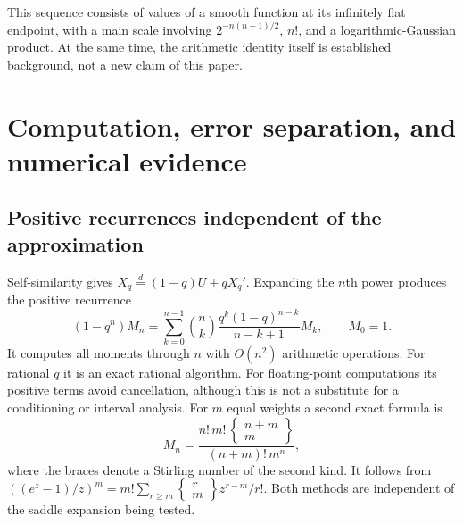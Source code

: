 \documentclass[11pt,a4paper]{article}
\numberwithin{equation}{section}
\theoremstyle{definition}\newtheorem{definition}[theorem]{Definition}
\theoremstyle{remark}\newtheorem{remark}[theorem]{Remark}
\begin{document}
This sequence consists of values of a smooth function at its infinitely flat endpoint, with a main scale involving $2^{-n(n-1)/2}$, $n!$, and a logarithmic-Gaussian product. At the same time, the arithmetic identity itself is established background, not a new claim of this paper.

\section{Computation, error separation, and numerical evidence}
\label{sec:computation}
\subsection{Positive recurrences independent of the approximation}
Self-similarity gives $X_q\overset d=(1-q)U+qX_q'$. Expanding the $n$th power produces the positive recurrence
\begin{equation}\label{eq:recurrence}
 (1-q^n)M_n=
 \sum_{k=0}^{n-1}\binom nk\frac{q^k(1-q)^{n-k}}{n-k+1}M_k,
 \qquad M_0=1.
\end{equation}
It computes all moments through $n$ with $O(n^2)$ arithmetic operations. For rational $q$ it is an exact rational algorithm. For floating-point computations its positive terms avoid cancellation, although this is not a substitute for a conditioning or interval analysis.
For $m$ equal weights a second exact formula is
\begin{equation}\label{eq:equalweights}
 M_n=\frac{n!\,m!\,\left\{\begin{smallmatrix}n+m\\m\end{smallmatrix}\right\}}
              {(n+m)!\,m^n},
\end{equation}
where the braces denote a Stirling number of the second kind. It follows from
$((e^z-1)/z)^m=m!\sum_{r\ge m}\left\{\begin{smallmatrix}r\\m\end{smallmatrix}\right\}z^{r-m}/r!$.
Both methods are independent of the saddle expansion being tested.
\end{document}
